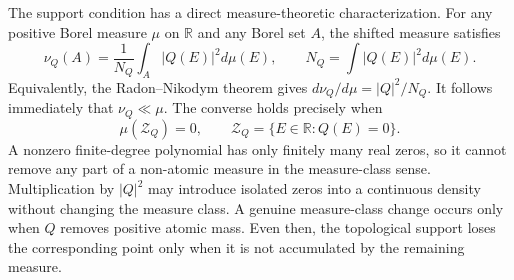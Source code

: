 \documentclass[a4paper,11pt]{article}
\def\dd{d}%
\theoremstyle{definition}
\theoremstyle{remark}
\newcommand{\dd}{\mathrm d}
\begin{document}
The support condition has a direct measure-theoretic characterization. For any positive Borel measure $\mu$ on $\mathbb R$ and any Borel set $A$, the shifted measure satisfies
\begin{equation}
   \nu_Q(A)
   =
   \frac{1}{N_Q}\int_A|Q(E)|^2\dd\mu(E),
   \qquad
   N_Q=\int|Q(E)|^2\dd\mu(E).
   \label{eq:absolute-continuity-seed-main}
\end{equation}
Equivalently, the Radon--Nikodym theorem \cite{Folland1999} gives 
$
   \dd\nu_Q/\dd\mu=|Q|^2/N_Q.
$
It follows immediately that $\nu_Q\ll\mu$. The converse holds precisely when
\begin{equation}
      \mu(\mathcal Z_Q)=0,
   \qquad
   \mathcal Z_Q=\{E\in\mathbb R:Q(E)=0\}.
   \label{eq:zero-set-support-loss-main}
\end{equation}
A nonzero finite-degree polynomial has only finitely many real zeros, so it cannot remove any part of a non-atomic measure in the measure-class sense. Multiplication by $|Q|^2$ may introduce isolated zeros into a continuous density without changing the measure class. A genuine measure-class change occurs only when $Q$ removes positive atomic mass. Even then, the topological support loses the corresponding point only when it is not accumulated by the remaining measure.
\end{document}

